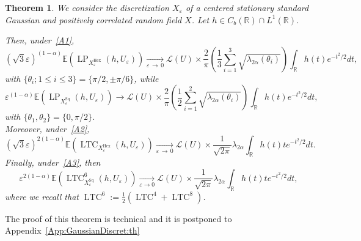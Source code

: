 \documentclass[10pt]{amsart}
\newtheorem{theo}{Theorem}[section]
\theoremstyle{definition}\newtheorem{defi}[theo]{Definition}\newtheorem{rema}[theo]{Remark}\newtheorem{exam}[theo]{Example}\newtheorem{exem}[theo]{Example}\newtheorem{nota}[theo]{Notation}
\newcommand{\R}{\mathbb{R}}
\newcommand{\E}{\mathbb{E}}
\newcommand{\eps}{\varepsilon}
\DeclareMathOperator{\LTC}{LTC}
\DeclareMathOperator{\LP}{LP}
\DeclareMathOperator{\Hex}{Hex}
\DeclareMathOperator{\Sq}{Sq}
\newcommand{\calL}{\mathcal{L}}
\begin{document}
\begin{theo}\label{GaussianDiscret:th}
We consider the discretization $X_\eps$ of a centered stationary standard Gaussian and positively correlated random field $X$. Let $h \in C_b(\R)\cap L^1(\R)$.

\noindent Then, under~\eqref{A1},
\[
\left(\sqrt{3}\eps\right)^{(1-\alpha)}\E\left(\LP_{X_\eps^{\Hex}}(h,U_\eps)\right)\underset{\eps\,\rightarrow\,0}{\longrightarrow}{\calL}(U)\times \frac{2}{{\pi}}
\left(\frac{1}{3}\sum_{i=1}^3\sqrt{{\lambda_{{2\alpha}}(\theta_i)}}\right)\int_{\R}h(t)e^{-t^2/2}dt,
\]
with $\{\theta_i;1\le i\le 3\}=\{\pi/2,\pm\pi/6\}$, while
\[
\eps^{(1-\alpha)}\E\left(\LP_{X_\eps^{\Sq}}(h,U_\eps)\right)\longrightarrow
{\calL}(U)\times \frac{2}{{\pi}} \left(\frac{1}{2}\sum_{i=1}^2\sqrt{{\lambda_{{2\alpha}}(\theta_i)}}\right)\int_{\R}h(t)e^{-t^2/2}dt,
\]
with $\{\theta_1,\theta_2\}=\{0,\pi/2\}$.\\
Moreover, under~\eqref{A2},
\[
\left(\sqrt{3}\eps\right)^{2(1-\alpha)}\E\left(\LTC_{X_\eps^{\Hex}}(h,U_\eps)\right)\underset{\eps\,\rightarrow\,0}{\longrightarrow} {\calL}(U)\times\frac{1}{\sqrt{2\pi}}\lambda_{{2\alpha}}\int_{\R}h(t)te^{-t^2/2}dt.
\]
Finally, under~\eqref{A3}, then
\[
\eps^{2(1-\alpha)}\E\left(\LTC^6_{X_\eps^{\Sq}}(h,U_\eps)\right)\underset{\eps\rightarrow 0}{\longrightarrow} {\calL}(U)\times
\frac{1}{\sqrt{2\pi}}\lambda_{{2\alpha}}\int_{\R}h(t)te^{-t^2/2}dt,
\]
where we recall that $\LTC^6:=\frac{1}{2}(\LTC^4+ \LTC^8)$.
\end{theo}


The proof of this theorem is technical and it is postponed to Appendix~\ref{App:GaussianDiscret:th}
\end{document}
